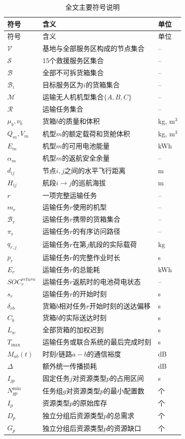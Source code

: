 \documentclass[UTF8,a4paper,12pt]{ctexart}
\begin{document}
\begin{longtable}{p{3.0cm}p{8.6cm}p{1.8cm}}
\caption{全文主要符号说明}\label{tab:main_symbols}\\
\toprule
符号 & 含义 & 单位\\
\midrule
\endfirsthead
\toprule
符号 & 含义 & 单位\\
\midrule
\endhead
$\mathcal V$ & 基地与全部服务区构成的节点集合 & --\\
$\mathcal S$ & 15个救援服务区集合 & --\\
$\mathcal B$ & 全部不可拆货箱集合 & --\\
$\mathcal B_i$ & 目标服务区为$i$的货箱集合 & --\\
$\mathcal M$ & 运输无人机机型集合$\{A,B,C\}$ & --\\
$\mathcal R$ & 运输任务集合 & --\\
$\mu_b,\nu_b$ & 货箱$b$的质量和体积 & kg, m$^3$\\
$Q_m,V_m$ & 机型$m$的额定载荷和货舱体积 & kg, m$^3$\\
$E_m$ & 机型$m$的可用电池能量 & kWh\\
$\alpha_m$ & 机型$m$的返航安全余量 & --\\
$d_{ij}$ & 节点$i,j$之间的水平飞行距离 & m\\
$H_{ij}$ & 航段$i\rightarrow j$的巡航海拔 & m\\
$r$ & 一项完整运输任务 & --\\
$m_r$ & 运输任务$r$使用的机型 & --\\
$\mathcal B_r$ & 运输任务$r$携带的货箱集合 & --\\
$\pi_r$ & 运输任务$r$的有序访问路径 & --\\
$q_{r,j}$ & 运输任务$r$在第$j$航段的实际载荷 & kg\\
$p_r$ & 运输任务$r$的完整作业时长 & s\\
$E_r$ & 运输任务$r$的总能耗 & kWh\\
$SOC_r^{return}$ & 运输任务$r$返航时的电池荷电状态 & --\\
$s_r$ & 运输任务$r$的开始时刻 & s\\
$\delta_{rb}$ & 货箱$b$相对任务$r$开始时刻的送达偏移 & s\\
$C_b$ & 货箱$b$的实际送达时刻 & s\\
$L_w$ & 全部货箱的加权迟到 & s\\
$T_{\max}$ & 运输任务或联合系统的最后完成时刻 & s\\
$M_{ab}(t)$ & 时刻$t$链路$a-b$的通信裕度 & dB\\
$\Delta$ & 额外统一传播损耗 & dB\\
$I_{jp}$ & 固定任务$j$对资源类型$p$的占用区间 & s\\
$N_{gp}^{\min}$ & 任务组$g$对资源类型$p$的最小配置数 & 个\\
$I_p$ & 资源类型$p$的原始库存 & 个\\
$D_p$ & 独立分组后资源类型$p$的总需求 & 个\\
$G_p$ & 独立分组后资源类型$p$的资源缺口 & 个\\
\bottomrule
\end{longtable}
\end{document}

